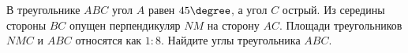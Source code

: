 \begin{ex}
	\begin{condition}
		В треугольнике \( ABC  \) угол \( A  \) равен \( 45\degree \), а угол \( C \) острый. Из середины стороны \( BC  \) опущен перпендикуляр \( NM  \) на сторону \( AC \). Площади треугольников \( NMC  \) и \( ABC  \) относятся	как \( 1 : 8 \). Найдите углы треугольника \( ABC \).
	\end{condition}
	\answer{\( 45\degree, 90\degree, 45\degree \)}
\end{ex}